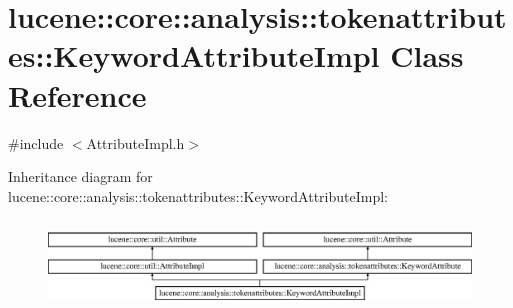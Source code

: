 \hypertarget{classlucene_1_1core_1_1analysis_1_1tokenattributes_1_1KeywordAttributeImpl}{}\section{lucene\+:\+:core\+:\+:analysis\+:\+:tokenattributes\+:\+:Keyword\+Attribute\+Impl Class Reference}
\label{classlucene_1_1core_1_1analysis_1_1tokenattributes_1_1KeywordAttributeImpl}


{\ttfamily \#include $<$Attribute\+Impl.\+h$>$}

Inheritance diagram for lucene\+:\+:core\+:\+:analysis\+:\+:tokenattributes\+:\+:Keyword\+Attribute\+Impl\+:\begin{figure}[H]
\begin{center}
\leavevmode
\includegraphics[height=2.372881cm]{classlucene_1_1core_1_1analysis_1_1tokenattributes_1_1KeywordAttributeImpl}
\end{center}
\end{figure}
